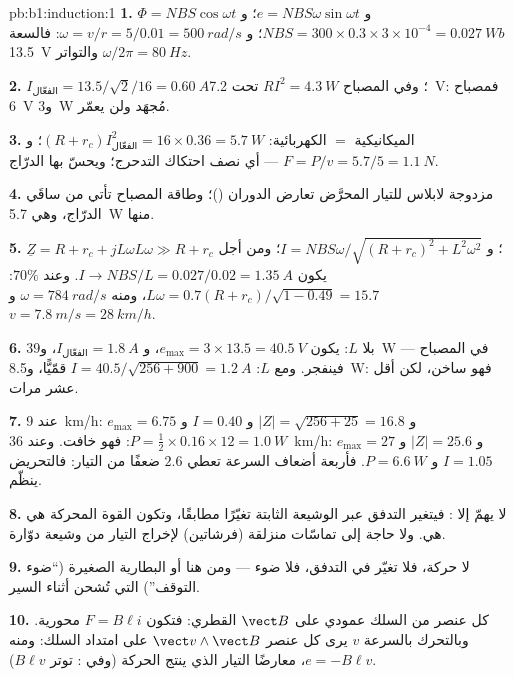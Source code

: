\begin{solution}{pb:b1:induction:1}
\textbf{1.} $\Phi = NBS\cos\omega t$ و $e = NBS\omega\sin\omega t$؛ و $NBS = 300 \times
0.3 \times 3 \times 10^{-4} = \qty{0.027}{Wb}$؛ و $\omega = v/r = 5/0.01 = \qty{500}{rad/s}$:
فالسعة \qty{13.5}{V} والتواتر $\omega/2\pi = \qty{80}{Hz}$.

\textbf{2.} $I_{\text{الفعّال}} = 13.5/\sqrt2/16 = \qty{0.60}{A}$؛ وفي المصباح $RI^2 = \qty{4.3}{W}$
تحت \qty{7.2}{V}: فمصباح \qty{6}{V} و\qty{3}{W} مُجهَد ولن
يعمّر.

\textbf{3.} الميكانيكية $=$ الكهربائية: $(R + r_c)I_{\text{الفعّال}}^2 = 16 \times 0.36 =
\qty{5.7}{W}$؛ و $F = P/v = 5.7/5 = \qty{1.1}{N}$ --- أي نصف احتكاك التدحرج؛
ويحسّ بها الدرّاج.

\textbf{4.} مزدوجة لابلاس للتيار المحرَّض تعارض الدوران
()؛ وطاقة المصباح تأتي من ساقَي الدرّاج، وهي \qty{5.7}{W} منها.

\textbf{5.} $\underline Z = R + r_c + jL\omega$؛ و $I = NBS\omega/\sqrt{(R + r_c)^2 + L^2\omega^2}$؛
ومن أجل $L\omega \gg R + r_c$ يكون $I \to NBS/L = 0.027/0.02 = \qty{1.35}{A}$. وعند $70\%$: $L\omega
= 0.7(R + r_c)/\sqrt{1 - 0.49} = 15.7$، ومنه $\omega = \qty{784}{rad/s}$ و $v = \qty{7.8}{m/s}
= \qty{28}{km/h}$.

\textbf{6.} بلا $L$: يكون $e_{\max} = 3 \times 13.5 = \qty{40.5}{V}$، و
$I_{\text{الفعّال}} = \qty{1.8}{A}$، و\qty{39}{W} في المصباح --- فينفجر. ومع $L$: $I = 40.5/\sqrt{256 +
900} = \qty{1.2}{A}$ قمّيًّا، و\qty{8.5}{W}: فهو ساخن، لكن أقل عشر مرات.

\textbf{7.} عند \qty{9}{km/h}: $e_{\max} = 6.75$ و $|Z| = \sqrt{256 + 25} = 16.8$ و $I = 0.40$
و $P = \tfrac12 \times 0.16 \times 12 = \qty{1.0}{W}$: فهو خافت. وعند \qty{36}{km/h}: $e_{\max} = 27$
و $|Z| = 25.6$ و $I = 1.05$ و $P = \qty{6.6}{W}$. فأربعة أضعاف السرعة تعطي $2.6$ ضعفًا
من التيار: فالتحريض ينظّم.

\textbf{8.} لا يهمّ إلا : فيتغير التدفق عبر الوشيعة
الثابتة تغيّرًا مطابقًا، وتكون القوة المحركة هي هي. ولا حاجة إلى تماسّات منزلقة (فرشاتين)
لإخراج التيار من وشيعة دوّارة.

\textbf{9.} لا حركة، فلا تغيّر في التدفق، فلا ضوء --- ومن هنا  أو
البطارية الصغيرة (``ضوء التوقف'') التي تُشحن أثناء السير.

\textbf{10.} كل عنصر من السلك عمودي على $\vect B$ القطري:
فتكون $F = B\ell i$ محورية. وبالتحرك بالسرعة $v$ يرى كل عنصر $\vect v\wedge\vect B$
على امتداد السلك: ومنه $e = -B\ell v$، معارضًا التيار الذي ينتج
الحركة (وفي : توتر $B\ell v$).


\end{solution}
